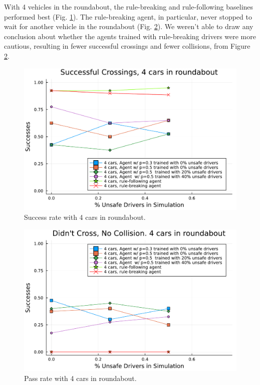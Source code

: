 \documentclass[conference]{IEEEtran}
\begin{document}
With 4 vehicles in the roundabout, the rule-breaking and rule-following baselines performed best (Fig. \ref{fig:success_4cars}). The rule-breaking agent, in particular, never stopped to wait for another vehicle in the roundabout (Fig. \ref{fig:passes_4cars}). We weren't able to draw any conclusion about whether the agents trained with rule-breaking drivers were more cautious, resulting in fewer successful crossings and fewer collisions, from Figure \ref{fig:passes_4cars}.
\begin{figure}[h]
	\centering
	\includegraphics[width=0.9\linewidth]{figures/successes_3.pdf}
	\caption{Success rate with 4 cars in roundabout.}
	\label{fig:success_4cars}
\end{figure}
\begin{figure}[h]
	\centering
	\includegraphics[width=0.9\linewidth]{figures/passes_3.pdf}
	\caption{Pass rate with 4 cars in roundabout.}
	\label{fig:passes_4cars}
\end{figure}
\end{document}
